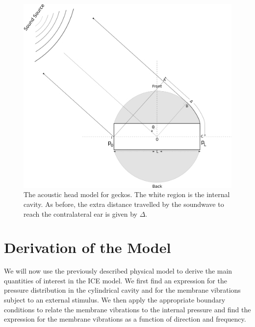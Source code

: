 \begin{figure}[ht]
 \includegraphics[width=.75\linewidth]{Diagrams/acousticheadmodel.png}
 \caption[Acoustic head model for geckos]{The acoustic head model for geckos. The white region 
 is the internal cavity. As before, the extra distance travelled by the soundwave to reach the contralateral ear is given by 
 $\Delta$.}
\end{figure}
 
\section{Derivation of the Model}
We will now use the previously described physical model to derive the main quantities of interest in the ICE model. We first find an expression
for the pressure distribution in the cylindrical cavity and for the membrane vibrations subject to an external stimulus. We then apply the 
appropriate boundary conditions to relate the membrane vibrations to the internal pressure and find the expression for the membrane
vibrations as a function of direction and frequency.
